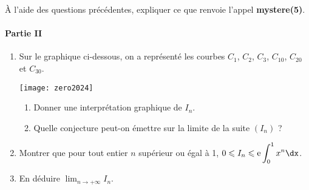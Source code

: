 \documentclass[11pt,fleqn, openany]{book} %
\begin{document}
\begin{exercise}[subtitle={(Sujet zéro 2024)}]
\begin{enumerate}


À l'aide des questions précédentes, expliquer ce que renvoie l'appel \textbf{mystere(5)}.

\end{enumerate}
\newpage 
\paragraph{Partie II}

\begin{enumerate}

\item Sur le graphique ci-dessous, on a représenté les courbes $C_1$, $C_2$, $C_3$, $C_{10}$, $C_{20}$ et $C_{30}$.
\begin{center}
\texttt{[image: zero2024]}
\end{center}
\begin{enumerate}
\item Donner une interprétation graphique de $I_n$.
\item Quelle conjecture peut-on émettre sur la limite de la suite $(I_n)$ ?
\end{enumerate}
\item Montrer que pour tout entier $n$ supérieur ou égal à 1, $0\leqslant I_n \leqslant \e \displaystyle\int_0^1x^n \dx$.
\item En déduire $\displaystyle\lim_{n \to +\infty}I_n$.
\end{enumerate}
\end{exercise}
\end{document}
